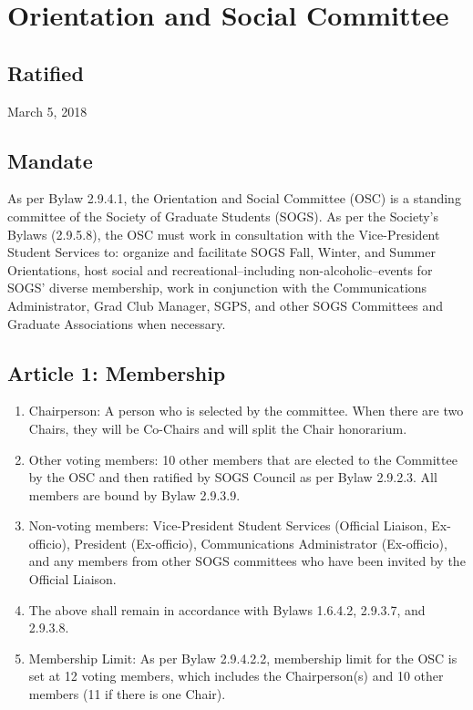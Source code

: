 \section{Orientation and Social Committee}
\subsection{Ratified}
March 5, 2018
\subsection{Mandate}
As per Bylaw 2.9.4.1, the Orientation and Social Committee (OSC) is a standing committee of the Society of Graduate Students (SOGS). As per the Society's Bylaws (2.9.5.8), the OSC must work in consultation with the Vice-President Student Services to: organize and facilitate SOGS Fall, Winter, and Summer Orientations, host social and recreational--including non-alcoholic--events for SOGS' diverse membership, work in conjunction with the Communications Administrator, Grad Club Manager, SGPS, and other SOGS Committees and Graduate Associations when necessary.

\subsection{Article 1: Membership}
\begin{enumerate}[label*=\arabic*., align=left]	
\item Chairperson: A person who is selected by the committee. When there are two Chairs, they will be Co-Chairs and will split the Chair honorarium. 
\item Other voting members: 10 other members that are elected to the Committee by the OSC and then ratified
by SOGS Council as per Bylaw 2.9.2.3. All members are bound by Bylaw 2.9.3.9.
\item Non-voting members: Vice-President Student Services (Official Liaison, Ex-officio), President (Ex-officio),
Communications Administrator (Ex-officio), and any members from other SOGS committees who have been
invited by the Official Liaison.
\item The above shall remain in accordance with Bylaws 1.6.4.2, 2.9.3.7, and 2.9.3.8.
\item Membership Limit: As per Bylaw 2.9.4.2.2, membership limit for the OSC is set at 12 voting members, which includes the Chairperson(s) and 10 other members (11 if there is one Chair).
\end{enumerate}

